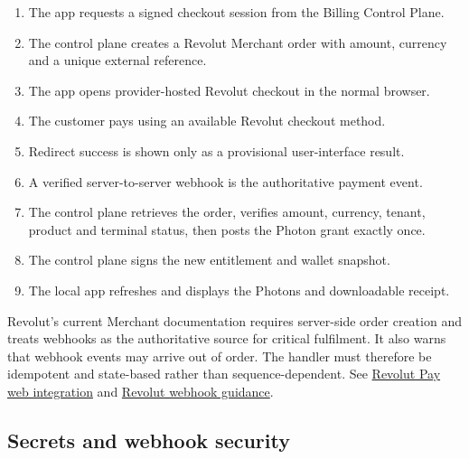 \documentclass[11pt]{article}
\begin{document}
\begin{enumerate}
  \item The app requests a signed checkout session from the Billing Control Plane.
  \item The control plane creates a Revolut Merchant order with amount, currency and a unique external reference.
  \item The app opens provider-hosted Revolut checkout in the normal browser.
  \item The customer pays using an available Revolut checkout method.
  \item Redirect success is shown only as a provisional user-interface result.
  \item A verified server-to-server webhook is the authoritative payment event.
  \item The control plane retrieves the order, verifies amount, currency, tenant, product and terminal status, then posts the Photon grant exactly once.
  \item The control plane signs the new entitlement and wallet snapshot.
  \item The local app refreshes and displays the Photons and downloadable receipt.
\end{enumerate}

Revolut's current Merchant documentation requires server-side order creation and treats webhooks as the authoritative source for critical fulfilment. It also warns that webhook events may arrive out of order. The handler must therefore be idempotent and state-based rather than sequence-dependent. See \href{https://developer.revolut.com/docs/guides/merchant/accept-payments/online-payments/revolut-pay/web}{Revolut Pay web integration} and \href{https://developer.revolut.com/docs/guides/merchant/monitor-and-observe/webhooks/using-webhooks}{Revolut webhook guidance}.

\subsection{Secrets and webhook security}
\end{document}
